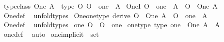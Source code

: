 \begin{isabellebody}
\isanewline
{}\isamarkupfalse%
\ {\isacharbrackleft}{\kern0pt}typeclass{\isacharbrackright}{\kern0pt}{\isacharcolon}{\kern0pt}\ {\isachardoublequoteopen}One\ A\ {\isasymequiv}\ type\ {\isacharparenleft}{\kern0pt}{\isasymlambda}O{\isachardot}{\kern0pt}\ O\ {\isacharat}{\kern0pt}{\isacharat}{\kern0pt}\ one\ {\isacharcolon}{\kern0pt}\ A{\isacharparenright}{\kern0pt}{\isachardoublequoteclose}\isanewline
\isanewline
{}\isamarkupfalse%
\ OneI{\isacharcolon}{\kern0pt}\ {\isachardoublequoteopen}O\ {\isacharat}{\kern0pt}{\isacharat}{\kern0pt}\ one\ {\isacharcolon}{\kern0pt}\ A\ {\isasymLongrightarrow}\ O\ {\isacharcolon}{\kern0pt}\ One\ A{\isachardoublequoteclose}\isanewline
%
\isadelimproof
\ \ %
\endisadelimproof
%
\isatagproof
{}\isamarkupfalse%
\ One{\isacharunderscore}{\kern0pt}def\ \isamarkupfalse%
\ unfold{\isacharunderscore}{\kern0pt}types%
\endisatagproof
{\isafoldproof}%
%
\isadelimproof
\isanewline
%
\endisadelimproof
\isanewline
{}\isamarkupfalse%
\ One{\isacharunderscore}{\kern0pt}one{\isacharunderscore}{\kern0pt}type\ {\isacharbrackleft}{\kern0pt}derive{\isacharbrackright}{\kern0pt}{\isacharcolon}{\kern0pt}\ {\isachardoublequoteopen}O\ {\isacharcolon}{\kern0pt}\ One\ A\ {\isasymLongrightarrow}\ O\ {\isacharat}{\kern0pt}{\isacharat}{\kern0pt}\ one\ {\isacharcolon}{\kern0pt}\ A{\isachardoublequoteclose}\isanewline
%
\isadelimproof
\ \ %
\endisadelimproof
%
\isatagproof
{}\isamarkupfalse%
\ One{\isacharunderscore}{\kern0pt}def\ \isamarkupfalse%
\ unfold{\isacharunderscore}{\kern0pt}types%
\endisatagproof
{\isafoldproof}%
%
\isadelimproof
\isanewline
%
\endisadelimproof
\isanewline
{}\isamarkupfalse%
\ {\isachardoublequoteopen}one\ O\ {\isasymequiv}\ O\ {\isacharat}{\kern0pt}{\isacharat}{\kern0pt}\ one{\isachardoublequoteclose}\isanewline
\isanewline
{}\isamarkupfalse%
\ one{\isacharunderscore}{\kern0pt}type\ {\isacharbrackleft}{\kern0pt}type{\isacharbrackright}{\kern0pt}{\isacharcolon}{\kern0pt}\ {\isachardoublequoteopen}one\ {\isacharcolon}{\kern0pt}\ One\ A\ {\isasymRightarrow}\ A{\isachardoublequoteclose}\isanewline
%
\isadelimproof
\ \ %
\endisadelimproof
%
\isatagproof
{}\isamarkupfalse%
\ one{\isacharunderscore}{\kern0pt}def\ \isamarkupfalse%
\ auto%
\endisatagproof
{\isafoldproof}%
%
\isadelimproof
\isanewline
%
\endisadelimproof
\isanewline
{}\isamarkupfalse%
\ one{\isacharunderscore}{\kern0pt}implicit\ {\isacharcolon}{\kern0pt}{\isacharcolon}{\kern0pt}\ {\isachardoublequoteopen}set{\isachardoublequoteclose}\isanewline

\end{isabellebody}
